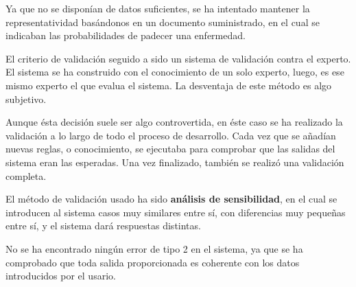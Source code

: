 Ya que no se disponían de datos suficientes, se ha intentado mantener la representatividad basándonos en un documento suministrado, en el cual se indicaban las probabilidades de padecer una enfermedad.

El criterio de validación seguido a sido un sistema de validación contra el experto. El sistema se ha construido con el conocimiento de un solo experto, luego, es ese mismo experto el que evalua el sistema. La desventaja de este método es algo subjetivo.


Aunque ésta decisión suele ser algo controvertida, en éste caso se ha realizado la validación a lo largo de todo el proceso de desarrollo. Cada vez que se añadían nuevas reglas, o conocimiento, se ejecutaba para comprobar que las salidas del sistema eran las esperadas. Una vez finalizado, también se realizó una validación completa.

El método de validación usado ha sido \textbf{análisis de sensibilidad}, en el cual se introducen al sistema casos muy similares entre sí, con diferencias muy pequeñas entre sí, y el sistema dará respuestas distintas.

No se ha encontrado ningún error de tipo 2 en el sistema, ya que se ha comprobado que toda salida proporcionada es coherente con los datos introducidos por el usario.
